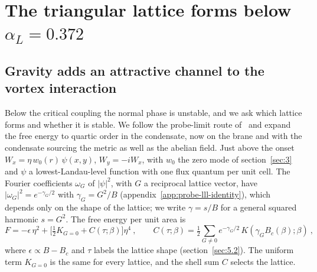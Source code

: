\section{The triangular lattice forms below \texorpdfstring{$\alpha_L = 0.372$}{alpha\_L = 0.372}}
\label{sec:5}

\subsection{Gravity adds an attractive channel to the vortex interaction}
\label{sec:5.1}

Below the critical coupling the normal phase is unstable, and we ask which
lattice forms and whether it is stable. We follow the probe-limit route
of~\cite{Bu:2012mq} and expand the free energy to quartic order in the
condensate, now on the brane and with the condensate sourcing the metric as
well as the abelian field. Just above the onset
$W_x = \eta\,w_0(r)\,\psi(x,y)$, $W_y = -iW_x$, with $w_0$ the zero mode of
section~\ref{sec:3} and $\psi$ a lowest-Landau-level function with one flux
quantum per unit cell. The Fourier coefficients $\omega_G$ of $|\psi|^2$,
with $G$ a reciprocal lattice vector, have $|\omega_G|^2 = e^{-\gamma_G/2}$ with
$\gamma_G = G^2/B$ (appendix~\ref{app:probe-lll-identity}), which depends
only on the shape of the lattice; we write $\gamma = s/B$ for a general
squared harmonic $s = G^2$. The free energy per unit area is
\begin{equation}
F = -\epsilon\,\eta^2 + \Big[\tfrac12 K_{G=0} + C(\tau;\beta)\Big]\eta^4~,
\qquad
C(\tau;\beta) = \tfrac12\sum_{G\neq0} e^{-\gamma_G/2}\,K(\gamma_G B_c(\beta);\beta)~,
\end{equation}
where $\epsilon \propto B - B_c$ and $\tau$ labels the lattice shape
(section~\ref{sec:5.2}). The uniform term $K_{G=0}$ is the same for every
lattice, and the shell sum $C$ selects the lattice.

